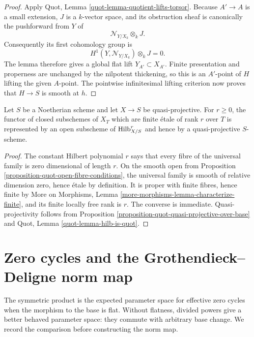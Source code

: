 \begin{proof}
Apply Quot, Lemma \ref{quot-lemma-quotient-lifts-torsor}. Because
$A' \to A$ is a small extension, $J$ is a $k$-vector space, and its
obstruction sheaf is canonically the pushforward from $Y$ of
$$
\mathcal{N}_{Y/X_k} \otimes_k J.
$$
Consequently its first cohomology group is
$$
H^1(Y, \mathcal{N}_{Y/X_k}) \otimes_k J = 0.
$$
The lemma therefore gives a global flat lift $Y_{A'} \subset X_{A'}$.
Finite presentation and properness are unchanged by the nilpotent
thickening, so this is an $A'$-point of $H$ lifting the given $A$-point.
The pointwise infinitesimal lifting criterion now proves that $H \to S$ is
smooth at $h$.
\end{proof}

\begin{lemma}
\label{corollary-finite-etale-Hilbert-open}
Let $S$ be a Noetherian scheme and let $X \to S$ be quasi-projective. For
$r \geq 0$, the functor of closed subschemes of $X_T$ which are finite
\'etale of rank $r$ over $T$ is represented by an open subscheme of
$\mathrm{Hilb}^r_{X/S}$ and hence by a quasi-projective $S$-scheme.
\end{lemma}

\begin{proof}
The constant Hilbert polynomial $r$ says that every fibre of the universal
family is zero dimensional of length $r$. On the smooth open from
Proposition \ref{proposition-quot-open-fibre-conditions}, the universal
family is smooth of relative dimension zero, hence \'etale by definition.
It is proper with finite
fibres, hence finite by More on Morphisms, Lemma
\ref{more-morphisms-lemma-characterize-finite}, and its finite locally free
rank is $r$. The converse is immediate. Quasi-projectivity follows from
Proposition \ref{proposition-quot-quasi-projective-over-base} and Quot,
Lemma \ref{quot-lemma-hilb-is-quot}.
\end{proof}









\section{Zero cycles and the Grothendieck--Deligne norm map}
\label{section-zero-cycles}

\noindent
The symmetric product is the expected parameter space for effective zero
cycles when the morphism to the base is flat. Without flatness, divided
powers give a better behaved parameter space: they commute with arbitrary
base change. We record the comparison before constructing the norm map.

